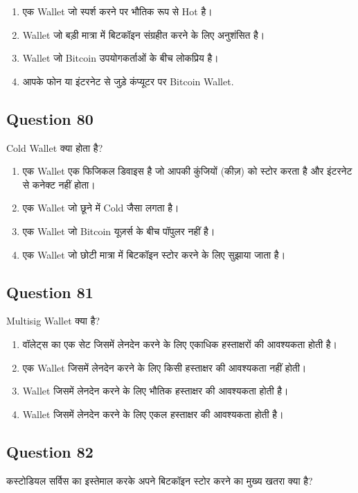 \documentclass[12pt,a4paper]{article}
\begin{document}
\begin{enumerate}[label=\Alph*., leftmargin=*]
\item एक Wallet जो स्पर्श करने पर भौतिक रूप से Hot है।
\item Wallet जो बड़ी मात्रा में बिटकॉइन संग्रहीत करने के लिए अनुशंसित है।
\item Wallet जो Bitcoin उपयोगकर्ताओं के बीच लोकप्रिय है।
\item आपके फोन या इंटरनेट से जुड़े कंप्यूटर पर Bitcoin Wallet.
\end{enumerate}

\bigskip


\subsection*{Question 80}
Cold Wallet क्या होता है?

\begin{enumerate}[label=\Alph*., leftmargin=*]
\item एक Wallet एक फिजिकल डिवाइस है जो आपकी कुंजियों (कीज़) को स्टोर करता है और इंटरनेट से कनेक्ट नहीं होता।
\item एक Wallet जो छूने में Cold जैसा लगता है।
\item एक Wallet जो Bitcoin यूज़र्स के बीच पॉपुलर नहीं है।
\item एक Wallet जो छोटी मात्रा में बिटकॉइन स्टोर करने के लिए सुझाया जाता है।
\end{enumerate}

\bigskip


\subsection*{Question 81}
Multisig Wallet क्या है?

\begin{enumerate}[label=\Alph*., leftmargin=*]
\item वॉलेट्स का एक सेट जिसमें लेनदेन करने के लिए एकाधिक हस्ताक्षरों की आवश्यकता होती है।
\item एक Wallet जिसमें लेनदेन करने के लिए किसी हस्ताक्षर की आवश्यकता नहीं होती।
\item Wallet जिसमें लेनदेन करने के लिए भौतिक हस्ताक्षर की आवश्यकता होती है।
\item Wallet जिसमें लेनदेन करने के लिए एकल हस्ताक्षर की आवश्यकता होती है।
\end{enumerate}

\bigskip


\subsection*{Question 82}
कस्टोडियल सर्विस का इस्तेमाल करके अपने बिटकॉइन स्टोर करने का मुख्य खतरा क्या है?
\end{document}
